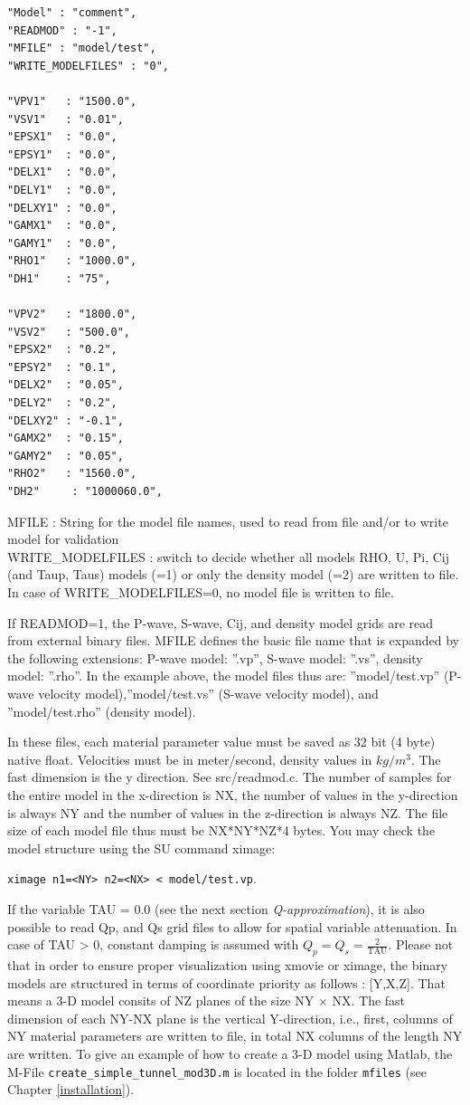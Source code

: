 \documentclass{hitec}
\begin{document}
\begin{verbatim}
"Model" : "comment",
"READMOD" : "-1",
"MFILE" : "model/test",
"WRITE_MODELFILES" : "0",

"VPV1"   : "1500.0",
"VSV1"   : "0.01",
"EPSX1"  : "0.0",
"EPSY1"  : "0.0",
"DELX1"  : "0.0",
"DELY1"  : "0.0",
"DELXY1" : "0.0",
"GAMX1"  : "0.0",
"GAMY1"  : "0.0",
"RHO1"   : "1000.0",
"DH1"    : "75",

"VPV2"   : "1800.0",
"VSV2"   : "500.0",
"EPSX2"  : "0.2",
"EPSY2"  : "0.1",
"DELX2"  : "0.05",
"DELY2"  : "0.2",
"DELXY2" : "-0.1",
"GAMX2"  : "0.15",
"GAMY2"  : "0.05",
"RHO2"   : "1560.0",
"DH2"     : "1000060.0",
\end{verbatim}
MFILE : String for the model file names, used to read from file and/or to write model for validation \\
WRITE\_MODELFILES : switch to decide whether all models RHO, U, Pi, Cij (and Taup, Taus) models (=1) or only the density model (=2) are written to file. In case of WRITE\_MODELFILES=0, no model file is written to file.

If READMOD=1, the P-wave, S-wave, Cij, and density model grids are read from external binary files. MFILE defines the basic file name that is expanded by the following extensions: P-wave model: ''.vp'', S-wave model: ''.vs'', density model: ''.rho''.  In the example above, the model files thus are: ''model/test.vp'' (P-wave velocity model),''model/test.vs'' (S-wave velocity model), and ''model/test.rho'' (density model). 

In these files, each material parameter value must be saved as 32 bit (4 byte) native float. Velocities must be in meter/second, density values in $kg/m^3$. The fast dimension is the y direction. See src/readmod.c. The number of samples for the entire model in the x-direction is NX, the number of values in the y-direction is always NY  and the number of values in the z-direction is always NZ. The file size of each model file thus must be NX*NY*NZ*4 bytes. You may check the model structure using the SU command ximage:

\lstinline {ximage n1=<NY> n2=<NX> < model/test.vp}.

If the variable TAU = 0.0 (see the next section \textit{Q-approximation}), it is also possible to read Qp, and Qs grid files to allow for spatial variable attenuation. In case of TAU > 0, constant damping is assumed with $Q_p=Q_s = \frac{2}{\mbox{TAU}}$. Please not that in order to ensure proper visualization using xmovie or ximage, the binary models are structured in terms of coordinate priority as follows : [Y,X,Z]. That means a 3-D model consits of NZ planes of the size NY $\times$ NX. The fast dimension of each NY-NX plane is the vertical Y-direction, i.e., first, columns of NY material parameters are written to file, in total NX columns of the length NY are written. To give an example of how to create a 3-D model using Matlab, the M-File  \lstinline{create_simple_tunnel_mod3D.m} is located in the folder  \lstinline{mfiles} (see Chapter \ref{installation}).
\end{document}
